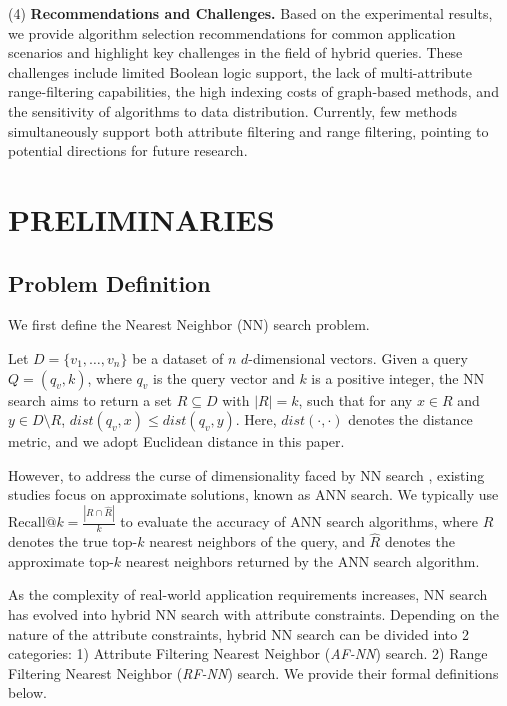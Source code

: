 \documentclass[sigconf, nonacm]{acmart}
\begin{document}
	(4)\textbf{ Recommendations and Challenges.}
	Based on the experimental results, we provide algorithm selection recommendations for common application scenarios and highlight key challenges in the field of hybrid queries. These challenges include limited Boolean logic support, the lack of multi-attribute range-filtering capabilities, the high indexing costs of graph-based methods, and the sensitivity of algorithms to data distribution. Currently, few methods simultaneously support both attribute filtering and range filtering, pointing to potential directions for future research.
	
	\section{PRELIMINARIES}
	
	\subsection{Problem Definition}
	
	We first define the Nearest Neighbor (NN) search problem.
	
	\begin{definition}[NN Search]
		
		Let \( D = \{v_1, \ldots, v_n\} \) be a dataset of \( n \) \( d \)-dimensional vectors. Given a query \( Q = (q_v, k) \), where \( q_v \) is the query vector and \( k \) is a positive integer, the NN search aims to return a set \( R \subseteq D \) with \( |R| = k \), such that for any \( x \in R \) and \( y \in D \setminus R \), \( \textit{dist}\!\left(q_v, x\right) \leq \textit{dist}\!\left(q_v, y\right) \). Here, \( \textit{dist}\!\left(\cdot, \cdot\right) \) denotes the distance metric, and we adopt Euclidean distance in this paper.
	\end{definition}
	
	However, to address the curse of dimensionality faced by NN search \cite{dimcurse}, existing studies focus on approximate solutions, known as ANN  search. We typically use $\text{Recall}@k = \frac{|R \cap \hat{R}|}{k}$ to evaluate the accuracy of ANN search algorithms, where $R$ denotes the true top-$k$ nearest neighbors of the query, and $\hat{R}$ denotes the approximate top-$k$ nearest neighbors returned by the ANN search algorithm.
	
	As the complexity of real-world application requirements increases, NN search has evolved into hybrid NN search with attribute constraints. Depending on the nature of the attribute constraints, hybrid NN search can be divided into 2 categories: 1) Attribute Filtering Nearest Neighbor (\textit{AF-NN}) search. 2) Range Filtering Nearest Neighbor (\textit{RF-NN}) search. We provide their formal definitions below.
	
\end{document}
